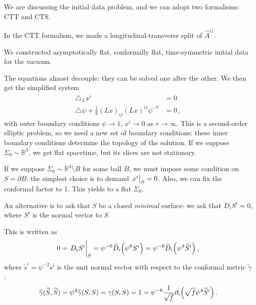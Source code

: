 \documentclass[main.tex]{subfiles}
\begin{document}

We are discussing the initial data problem, and we can adopt two formalisms: CTT and CTS. 

In the CTT formalism, we made a longitudinal-transverse split of  \(\hat{A}^{ij}\). 

We constructed asymptotically flat, conformally flat, time-symmetric initial data for the vacuum. 

The equations almost decouple: they can be solved one after the other. 
We then get the simplified system 
%
\begin{align}
\triangle_L x^{i} &= 0  \\
\triangle \psi + \frac{1}{8} (L x)_{ij} (Lx)^{ij} \psi^{-7} &= 0
\,,
\end{align}
%
with outer boundary conditions \(\psi \to 1\), \(x^{i} \to 0\) as \(r \to \infty \). 
This is a second-order elliptic problem, so we need a new set of boundary conditions: these inner boundary conditions determine the topology of the solution. If we suppose \(\Sigma_0 \sim \mathbb{R}^3\), we get flat spacetime, but its slices are not stationary. 

If we suppose \(\Sigma_0 \sim \mathbb{R}^3 \setminus B\) for some ball \(B\), we must impose some condition on \(S = \partial B\): the simplest choice is to demand \(\eval{x^{i}}_{S} = 0\).
Also, we can fix the conformal factor to 1. 
This yields to a flat \(\Sigma_0 \). 

An alternative is to ask that \(S\) be a closed \emph{minimal} surface:
we ask that \(D_i S^{i} = 0\), where \(S^{i}\) is the normal vector to \(S\). 

This is written as 
%
\begin{align}
0 = \eval{D_i S^{i}}_{S} = \psi^{-6} \widetilde{D}_{i} \qty(\psi^{6} S^{i}) 
= \psi^{-6} \widetilde{D}_{i} \qty(\psi^{4} \widetilde{S}^{i})
\,,
\end{align}
%
where \(\widetilde{s}^{i} = \psi^{-2} s^{i}\) is the unit  normal vector with respect to the conformal metric \(\widetilde{\gamma}\): 
%
\begin{align}
\widetilde{\gamma}(\widetilde{S}, \widetilde{S}) = \psi^{4} \widetilde{\gamma}(S, S) = \gamma (S, S) = 1 = \psi^{-6} \frac{1}{\sqrt{f}} \partial_{i} \qty(\sqrt{f} \psi^{4} \widetilde{S}^{i})
\,.
\end{align}
\end{document}

